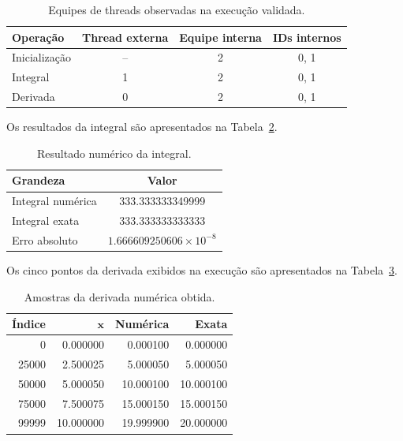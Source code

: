 \begin{table}[htbp]
    \centering
    \caption{Equipes de threads observadas na execução validada.}
    \label{tab:atvd08-threads}
    \begin{tabular}{|l|c|c|c|}
        \hline
        \textbf{Operação} &
        \textbf{Thread externa} &
        \textbf{Equipe interna} &
        \textbf{IDs internos} \\
        \hline
        Inicialização & -- & 2 & 0, 1 \\
        \hline
        Integral & 1 & 2 & 0, 1 \\
        \hline
        Derivada & 0 & 2 & 0, 1 \\
        \hline
    \end{tabular}
\end{table}

Os resultados da integral são apresentados na
Tabela~\ref{tab:atvd08-integral}.

\begin{table}[htbp]
    \centering
    \caption{Resultado numérico da integral.}
    \label{tab:atvd08-integral}
    \begin{tabular}{|l|c|}
        \hline
        \textbf{Grandeza} & \textbf{Valor} \\
        \hline
        Integral numérica & 333.333333349999 \\
        \hline
        Integral exata & 333.333333333333 \\
        \hline
        Erro absoluto & $1.666609250606\times10^{-8}$ \\
        \hline
    \end{tabular}
\end{table}

Os cinco pontos da derivada exibidos na execução são apresentados na
Tabela~\ref{tab:atvd08-derivada}.

\begin{table}[htbp]
    \centering
    \caption{Amostras da derivada numérica obtida.}
    \label{tab:atvd08-derivada}
    \begin{tabular}{|r|r|r|r|}
        \hline
        \textbf{Índice} &
        $\mathbf{x}$ &
        \textbf{Numérica} &
        \textbf{Exata} \\
        \hline
        0 &
        0.000000 &
        0.000100 &
        0.000000 \\
        \hline

        25000 &
        2.500025 &
        5.000050 &
        5.000050 \\
        \hline

        50000 &
        5.000050 &
        10.000100 &
        10.000100 \\
        \hline

        75000 &
        7.500075 &
        15.000150 &
        15.000150 \\
        \hline

        99999 &
        10.000000 &
        19.999900 &
        20.000000 \\
        \hline
    \end{tabular}
\end{table}

